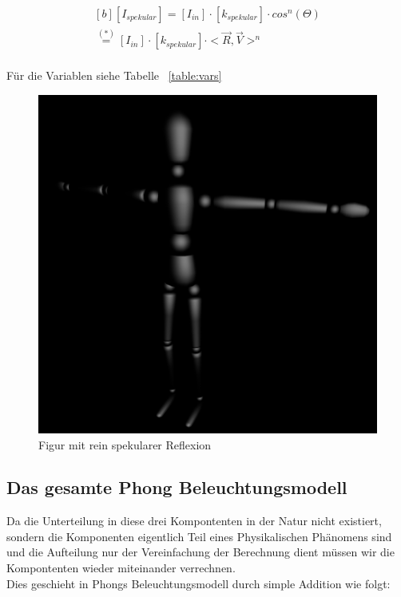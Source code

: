 \documentclass[a4paper]{scrartcl}%
\begin{document}
        \begin{equation}
            \label{eq:spek}
            \begin{multlined}[b]
                [I_{spekular}] = [I_{in}] \cdot [k_{spekular}] \cdot cos^n(\Theta)\\
                \overset{(*)}{=} [I_{in}] \cdot [k_{spekular}] \cdot <\vec{R}, \vec{V}>^n\\
            \end{multlined} 
        \end{equation}
    
         
        Für die Variablen siehe Tabelle ~\ref{table:vars}\\
        
        \begin{figure}[H]
            \centering
            \includegraphics[scale=0.2]{./possible-images/light-types/spec.jpg}
            \caption{Figur mit rein spekularer Reflexion}
            \label{fig:./possible-images/light-types/spec}
        \end{figure}
        

    \subsection{Das gesamte Phong Beleuchtungsmodell}%
    \label{sub:das_gesamte_phong_beleuchtungsmodell}
        Da die Unterteilung in diese drei Kompontenten in der Natur nicht existiert, sondern die Komponenten eigentlich Teil eines Physikalischen Phänomens sind und
        die Aufteilung nur der Vereinfachung der Berechnung dient müssen wir die Kompontenten wieder miteinander verrechnen.\\
        Dies geschieht in Phongs Beleuchtungsmodell durch simple Addition wie folgt:\\
\end{document}
